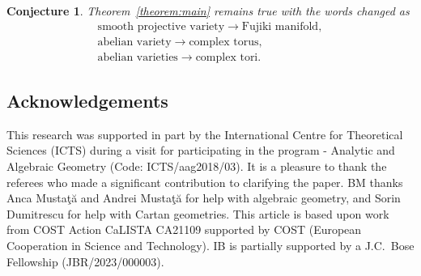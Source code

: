 \documentclass[pdftex]{sigma}
\numberwithin{equation}{section}
\newtheorem{Conjecture}[Theorem]{Conjecture}
 { \theoremstyle{definition}
\newtheorem{Definition}[Theorem]{Definition}
\newtheorem{Note}[Theorem]{Note}
\newtheorem{Example}[Theorem]{Example}
\newtheorem{Remark}[Theorem]{Remark} }
\begin{document}
\begin{Conjecture}
Theorem~{\rm \ref{theorem:main}} remains true with the words changed as
\begin{gather*}
\text{smooth projective variety}\to\text{Fujiki manifold},\\
\text{abelian variety}\to\text{complex torus},\\
\text{abelian varieties}\to\text{complex tori}.
\end{gather*}
\end{Conjecture}

\subsection*{Acknowledgements}

This research was supported in part by the International Centre for Theoretical Sciences (ICTS) during a visit for participating in the program - Analytic and Algebraic Geometry (Code: ICTS/aag2018/03).
It is a pleasure to thank the referees who made a significant contribution to clarifying the paper.
BM thanks Anca Musta\c{t}\u{a} and Andrei Musta\c{t}\u{a} for help with algebraic geometry, and Sorin Dumitrescu for help with Cartan geometries.
This article is based upon work from COST Action CaLISTA CA21109 supported by COST (European Cooperation in Science and Technology).
IB is partially supported by a J.C.~Bose Fellowship (JBR/2023/000003).

%
%

\providecommand{\MR}{\relax\ifhmode\unskip\space\fi MR }
\providecommand{\MRhref}[2]{%
 \href{http://www.ams.org/mathscinet-getitem?mr=#1}{#2}
}
\providecommand{\href}[2]{#2}
\end{document}
